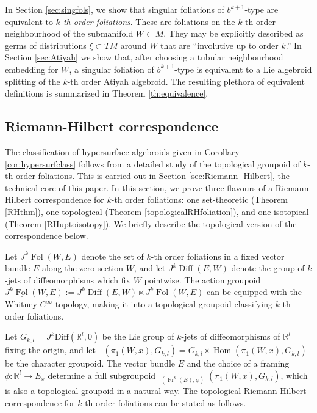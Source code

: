 \documentclass[10pt]{amsart}
\newcommand{\Hom}{\operatorname{Hom}}
\newcommand{\Diff}{{\operatorname{Diff}}}
\newcommand{\FolCat}{{\underline{\operatorname{Fol}}}}
\newcommand{\FolObj}{{\operatorname{Fol}}}
\DeclareMathOperator{\Rep}{\underline{\operatorname{Rep}}}
\newcommand{\Fr}{{\operatorname{Fr}}}
\numberwithin{theoremalpha}{section}
\numberwithin{equation}{section}
\numberwithin{definition}{section}
\numberwithin{theorem}{section}
\numberwithin{proposition}{section}
\numberwithin{lemma}{section}
\numberwithin{example}{section}
\numberwithin{remark}{section}
\numberwithin{corollary}{section}
\numberwithin{question}{section}
\numberwithin{problem}{section}
\numberwithin{assumption}{section}
\theoremstyle{named}
\numberwithin{equation}{section}
\begin{document}
In Section \ref{sec:singfols}, we show that singular foliations of $b^{k+1}$-type are equivalent to \emph{$k$-th order foliations}. These are foliations on the $k$-th order neighbourhood of the submanifold $W \subset M$. They may be explicitly described as germs of distributions $\xi \subset TM$ around $W$ that are ``involutive up to order $k$.'' In Section \ref{sec:Atiyah} we show that, after choosing a tubular neighbourhood embedding for $W$, a singular foliation of $b^{k+1}$-type is equivalent to a Lie algebroid splitting of the $k$-th order Atiyah algebroid. The resulting plethora of equivalent definitions is summarized in Theorem \ref{th:equivalence}. 

\subsection{Riemann-Hilbert correspondence}
The classification of hypersurface algebroids given in Corollary \ref{cor:hypersurfclass} follows from a detailed study of the topological groupoid of $k$-th order foliations. This is carried out in Section \ref{sec:Riemann--Hilbert}, the technical core of this paper. In this section, we prove three flavours of a Riemann-Hilbert correspondence for $k$-th order foliations: one set-theoretic (Theorem \ref{RHthm}), one topological (Theorem \ref{topologicalRHfoliation}), and one isotopical (Theorem \ref{RHuptoisotopy}). We briefly describe the topological version of the correspondence below. 

Let $J^k\FolObj(W,E)$ denote the set of $k$-th order foliations in a fixed vector bundle $E$ along the zero section $W$, and let $J^k\Diff(E,W)$ denote the group of $k$-jets of diffeomorphisms which fix $W$ pointwise. The action groupoid $J^{k}\FolCat(W,E) :=J^k\Diff(E,W) \ltimes J^k\FolObj(W,E)$ can be equipped with the Whitney $C^{\infty}$-topology, making it into a topological groupoid classifying $k$-th order foliations. 

Let $G_{k,l} = J^{k}\mathrm{Diff}(\mathbb{R}^l, 0)$ be the Lie group of $k$-jets of diffeomorphisms of $\mathbb{R}^l$ fixing the origin, and let $\Rep(\pi_{1}(W, x), G_{k,l}) = G_{k,l} \ltimes \Hom(\pi_{1}(W, x), G_{k,l})$ be the character groupoid. The vector bundle $E$ and the choice of a framing $\phi : \mathbb{R}^l \to E_{x}$ determine a full subgroupoid $\Rep_{(\Fr^k(E),\phi)}(\pi_{1}(W, x), G_{k,l})$, which is also a topological groupoid in a natural way. The topological Riemann-Hilbert correspondence for $k$-th order foliations can be stated as follows. 
\end{document}
